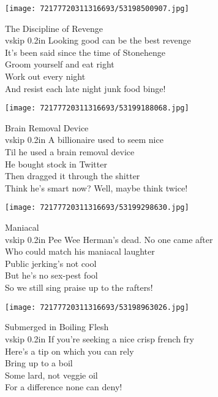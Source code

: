 \documentclass[10pt,letterpaper]{article}
\begin{document}
\begin{center}\texttt{[image: 72177720311316693/53198500907.jpg]}
\end{center}
\begin{center}
The Discipline of Revenge\\
vskip 0.2in
Looking good can be the best revenge\\
It's been said since the time of Stonehenge\\
Groom yourself and eat right\\
Work out every night\\
And resist each late night junk food binge!\\
\end{center}
\pagebreak

\begin{center}
\texttt{[image: 72177720311316693/53199188068.jpg]}
\end{center}

\begin{center}
Brain Removal Device\\
vskip 0.2in
A billionaire used to seem nice\\
Til he used a brain removal device\\
He bought stock in Twitter\\
Then dragged it through the shitter\\
Think he's smart now?  Well, maybe think twice!\\
\end{center}
\pagebreak

\begin{center}
\texttt{[image: 72177720311316693/53199298630.jpg]}
\end{center}

\begin{center}
Maniacal\\
vskip 0.2in
Pee Wee Herman's dead.  No one came after\\
Who could match his maniacal laughter\\
Public jerking's not cool\\
But he's no sex-pest fool\\
So we still sing praise up to the rafters!\\
\end{center}
\pagebreak

\begin{center}\texttt{[image: 72177720311316693/53198963026.jpg]}
\end{center}
\begin{center}
Submerged in Boiling Flesh\\
vskip 0.2in
If you're seeking a nice crisp french fry\\
Here's a tip on which you can rely\\
Bring up to a boil\\
Some lard, not veggie oil\\
For a difference none can deny!\\
\end{center}
\pagebreak
\end{document}
